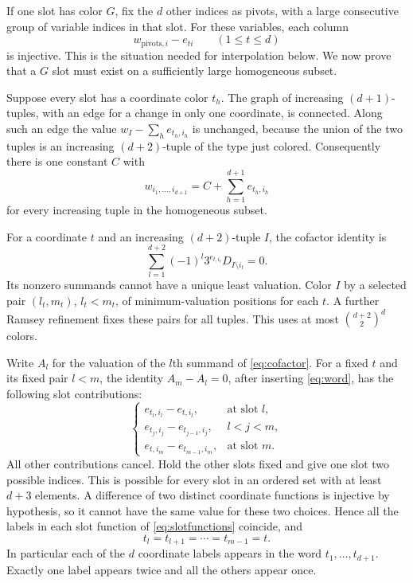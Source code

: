 \documentclass[11pt]{article}
\theoremstyle{definition}
\theoremstyle{remark}
\begin{document}
If one slot has color $G$, fix the $d$ other indices as pivots, with a
large consecutive group of variable indices in that slot. For these
variables, each column
\begin{equation}\label{eq:goodslot}
 w_{\text{pivots},i}-e_{ti}\qquad(1\le t\le d)
\end{equation}
is injective. This is the situation needed for interpolation below.
We now prove that a $G$ slot must exist on a sufficiently large
homogeneous subset.

Suppose every slot has a coordinate color $t_h$. The graph of increasing
$(d+1)$-tuples, with an edge for a change in only one coordinate, is
connected. Along such an edge the value
$w_I-\sum_h e_{t_h,i_h}$ is unchanged, because the union of the two
tuples is an increasing $(d+2)$-tuple of the type just colored.
Consequently there is one constant $C$ with
\begin{equation}\label{eq:word}
 w_{i_1,\ldots,i_{d+1}}=C+\sum_{h=1}^{d+1}e_{t_h,i_h}
\end{equation}
for every increasing tuple in the homogeneous subset.

For a coordinate $t$ and an increasing $(d+2)$-tuple $I$, the cofactor
identity is
\begin{equation}\label{eq:cofactor}
 \sum_{l=1}^{d+2}(-1)^l3^{e_{t,i_l}}D_{I\setminus i_l}=0.
\end{equation}
Its nonzero summands cannot have a unique least valuation. Color $I$
by a selected pair $(l_t,m_t)$, $l_t<m_t$, of minimum-valuation
positions for each $t$. A further Ramsey refinement fixes these pairs
for all tuples. This uses at most $\binom{d+2}{2}^{d}$ colors.

Write $A_l$ for the valuation of the $l$th summand of
\eqref{eq:cofactor}. For a fixed $t$ and its fixed pair $l<m$, the
identity $A_m-A_l=0$, after inserting \eqref{eq:word}, has the
following slot contributions:
\begin{equation}\label{eq:slotfunctions}
 \begin{cases}
 e_{t_l,i_l}-e_{t,i_l},&\text{at slot }l,\\
 e_{t_j,i_j}-e_{t_{j-1},i_j},&l<j<m,\\
 e_{t,i_m}-e_{t_{m-1},i_m},&\text{at slot }m.
 \end{cases}
\end{equation}
All other contributions cancel. Hold the other slots fixed and give
one slot two possible indices. This is possible for every slot in an
ordered set with at least $d+3$ elements. A difference of two distinct
coordinate functions is injective by hypothesis, so it cannot have
the same value for these two choices. Hence all the labels in each
slot function of \eqref{eq:slotfunctions} coincide, and
\begin{equation}\label{eq:intervalword}
 t_l=t_{l+1}=\cdots=t_{m-1}=t.
\end{equation}
In particular each of the $d$ coordinate labels appears in the word
$t_1,\ldots,t_{d+1}$. Exactly one label appears twice and all the
others appear once.
\end{document}

